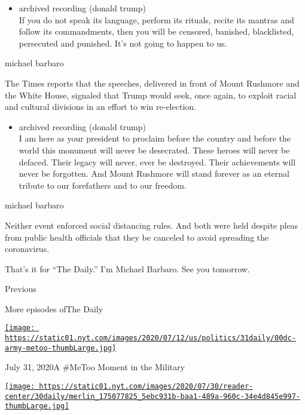 \begin{itemize}
\tightlist
\item
  archived recording (donald trump)\\
  If you do not speak its language, perform its rituals, recite its
  mantras and follow its commandments, then you will be censored,
  banished, blacklisted, persecuted and punished. It's not going to
  happen to us.
\end{itemize}

michael barbaro

The Times reports that the speeches, delivered in front of Mount
Rushmore and the White House, signaled that Trump would seek, once
again, to exploit racial and cultural divisions in an effort to win
re-election.

\begin{itemize}
\tightlist
\item
  archived recording (donald trump)\\
  I am here as your president to proclaim before the country and before
  the world this monument will never be desecrated. These heroes will
  never be defaced. Their legacy will never, ever be destroyed. Their
  achievements will never be forgotten. And Mount Rushmore will stand
  forever as an eternal tribute to our forefathers and to our freedom.
\end{itemize}

michael barbaro

Neither event enforced social distancing rules. And both were held
despite pleas from public health officials that they be canceled to
avoid spreading the coronavirus.

That's it for ``The Daily.'' I'm Michael Barbaro. See you tomorrow.

Previous

More episodes ofThe Daily

\href{https://www.nytimes.com/2020/07/31/podcasts/the-daily/vanessa-guillen-military-metoo.html?action=click\&module=audio-series-bar\&region=header\&pgtype=Article}{\texttt{[image: https://static01.nyt.com/images/2020/07/12/us/politics/31daily/00dc-army-metoo-thumbLarge.jpg]}}

July 31, 2020A \#MeToo Moment in the Military

\href{https://www.nytimes.com/2020/07/30/podcasts/the-daily/congress-facebook-amazon-google-apple.html?action=click\&module=audio-series-bar\&region=header\&pgtype=Article}{\texttt{[image: https://static01.nyt.com/images/2020/07/30/reader-center/30daily/merlin\_175077825\_5ebc931b-baa1-489a-960c-34e4d845e997-thumbLarge.jpg]}}

